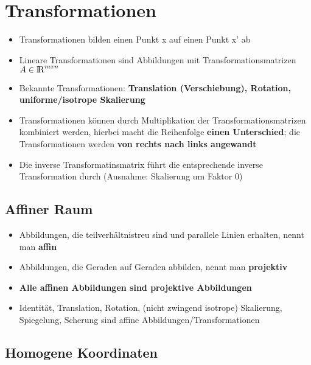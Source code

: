 \section{Transformationen}%
\label{tf:sec:transformationen}

\begin{itemize}
	\item Transformationen bilden einen Punkt x auf einen Punkt x' ab
	\item Lineare Transformationen sind Abbildungen mit Transformationsmatrizen $A \in {\rm I\!R}^{mxn}$
	\item Bekannte Transformationen: \textbf{Translation (Verschiebung), Rotation, uniforme/isotrope Skalierung}
	\item Transformationen können durch Multiplikation der Transformationsmatrizen kombiniert werden, hierbei macht die Reihenfolge \textbf{einen Unterschied}; die Transformationen werden \textbf{von rechts nach links angewandt}
	\item Die inverse Transformatinsmatrix führt die entsprechende inverse Transformation durch (Ausnahme: Skalierung um Faktor 0)
\end{itemize}

\subsection{Affiner Raum}%
\label{tf:sub:affiner_raum}

\begin{itemize}
	\item Abbildungen, die teilverhältnistreu sind und parallele Linien erhalten, nennt man \textbf{affin}
	\item Abbildungen, die Geraden auf Geraden abbilden, nennt man \textbf{projektiv}
	\item \textbf{Alle affinen Abbildungen sind projektive Abbildungen}
	\item Identität, Translation, Rotation, (nicht zwingend isotrope) Skalierung, Spiegelung, Scherung sind affine Abbildungen/Transformationen
\end{itemize}

\subsection{Homogene Koordinaten}%
\label{tf:sub:homogene_koordinaten}

